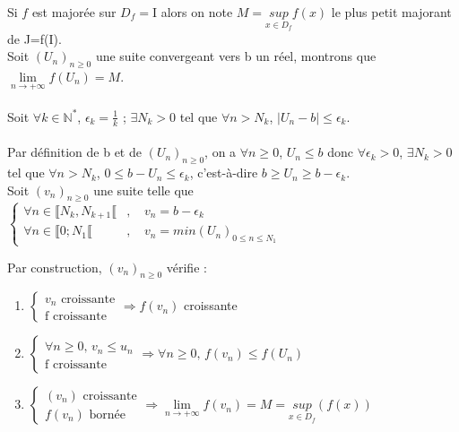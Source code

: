 \documentclass[a4paper,10pt]{book} %
\newcommand{\N}{\mathbb{N}}
\begin{document}
\bigskip\bigskip 

Si $f$ est majorée sur $D_{f}=$I alors on note $M=\underset{x\in D_{f}}{sup} f(x)$ le plus petit majorant de J=f(I).\\

Soit $(U_{n})_{n\geq 0}$ une suite convergeant vers b un réel, montrons que $\lim\limits_{n\rightarrow +\infty}f(U_{n})=M$.\\\\
Soit $\forall k\in \N^{*}$, $\epsilon_{k}=\frac{1}{k}$ ; $\exists N_{k}>0$ tel que $\forall n>N_{k}$, $|U_{n}-b|\leq \epsilon_{k}$.\\\\
Par définition de b et de $(U_{n})_{n\geq 0}$, on a $\forall n\geq 0$, $U_{n}\leq b$ donc $\forall \epsilon_{k}>0$, $\exists N_{k}>0$ tel que $\forall n>N_{k}$, $0\leq b-U_{n}\leq \epsilon_{k}$, c'est-à-dire $b\geq U_{n} \geq b-\epsilon_{k}$.\\

Soit $(v_{n})_{n\geq 0}$ une suite telle que $\left\{ \begin{array}{rcl}
\forall n \in \llbracket N_{k}, N_{k+1}\llbracket&\text{, }& v_{n}=b-\epsilon_{k} \\
\forall n\in \llbracket 0;N_{1}\llbracket&\text{, }& v_{n}=min(U_{n})_{0\leq n\leq N_{1}} \end{array} \right.$ \bigskip

Par construction, $(v_{n})_{n\geq 0}$ vérifie :

\begin{enumerate} \item $\left \{ \begin{array}{rcl} v_{n}\text{ croissante} \\
\text{f croissante} \end{array} \right. \Rightarrow f(v_{n})$ croissante\\
\item $\left\{ \begin{array}{rcl} \forall n\geq 0\text{, }v_{n}\leq u_{n} \\
\text{f croissante} \end{array} \right. \Rightarrow \forall n\geq 0\text{, }f(v_{n}) \leq f(U_{n})$\\
\item $\left\{\begin{array}{rcl} (v_{n})\text{ croissante} \\
f(v_{n})\text{ bornée } \end{array} \right. \Rightarrow \lim\limits_{n\rightarrow +\infty} f(v_{n})=M=\underset{x\in D_{f}}{sup} (f(x))$ \end{enumerate}
\end{document}
